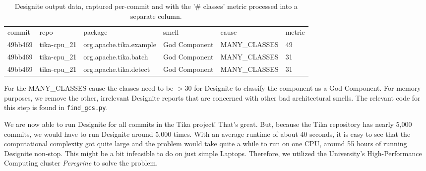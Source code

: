 \documentclass{article}
\begin{document}
\begin{enumerate}
    \begin{table}[ht]
    \begin{tabular}{llllll}
    commit                                   & repo         & package                 & smell         & cause         & metric \\
    49bb469 & tika-cpu\_21 & org.apache.tika.example & God Component & MANY\_CLASSES & 49     \\
    49bb469 & tika-cpu\_21 & org.apache.tika.batch   & God Component & MANY\_CLASSES & 31     \\
    49bb469 & tika-cpu\_21 & org.apache.tika.detect  & God Component & MANY\_CLASSES & 31    
    \end{tabular}
    \caption{Designite output data, captured per-commit and with the '\# classes' metric processed into a separate column.}
    \label{tab:designite-output}
    \end{table}
    
    For the MANY\_CLASSES cause the classes need to be $> 30$ for Designite to classify the component as a God Component. For memory purposes, we remove the other, irrelevant Designite reports that are concerned with other bad architectural smells. The relevant code for this step is found in \texttt{find\_gcs.py}.
\end{enumerate}

We are now able to run Designite for all commits in the Tika project! That's great. But, because the Tika repository has nearly 5,000 commits, we would have to run Designite around 5,000 times. With an average runtime of about 40 seconds, it is easy to see that the computational complexity got quite large and the problem would take quite a while to run on one CPU, around 55 hours of running Designite non-stop. This might be a bit infeasible to do on just simple Laptops. Therefore, we utilized the University's High-Performance Computing cluster \textit{Peregrine} to solve the problem.
\end{document}
